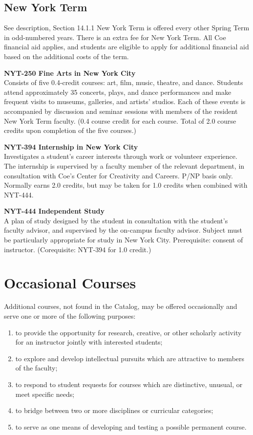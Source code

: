 \documentclass[
  letterpaper,
]{scrbook}
\providecommand{\tightlist}{%
  \setlength{\itemsep}{0pt}\setlength{\parskip}{0pt}}
\begin{document}
\subsection{New York Term}\label{sec-academic-programs-ny-term}

See description, Section 14.1.1 New York Term is offered every other
Spring Term in odd-numbered years. There is an extra fee for New York
Term. All Coe financial aid applies, and students are eligible to apply
for additional financial aid based on the additional costs of the term.

\textbf{NYT-250 Fine Arts in New York City}\\
Consists of five 0.4-credit courses: art, film, music, theatre, and
dance. Students attend approximately 35 concerts, plays, and dance
performances and make frequent visits to museums, galleries, and
artists' studios. Each of these events is accompanied by discussion and
seminar sessions with members of the resident New York Term faculty.
(0.4 course credit for each course. Total of 2.0 course credits upon
completion of the five courses.)

\textbf{NYT-394 Internship in New York City}\\
Investigates a student's career interests through work or volunteer
experience. The internship is supervised by a faculty member of the
relevant department, in consultation with Coe's Center for Creativity
and Careers. P/NP basis only. Normally earns 2.0 credits, but may be
taken for 1.0 credits when combined with NYT-444.

\textbf{NYT-444 Independent Study}\\
A plan of study designed by the student in consultation with the
student's faculty advisor, and supervised by the on-campus faculty
advisor. Subject must be particularly appropriate for study in New York
City. Prerequisite: consent of instructor. (Corequisite: NYT-394 for 1.0
credit.)

\section{Occasional
Courses}\label{sec-academic-programs-occasional-courses}

Additional courses, not found in the Catalog, may be offered
occasionally and serve one or more of the following purposes:

\begin{enumerate}
\def\labelenumi{\arabic{enumi}.}
\tightlist
\item
  to provide the opportunity for research, creative, or other scholarly
  activity for an instructor jointly with interested students;
\item
  to explore and develop intellectual pursuits which are attractive to
  members of the faculty;
\item
  to respond to student requests for courses which are distinctive,
  unusual, or meet specific needs;
\item
  to bridge between two or more disciplines or curricular categories;
\item
  to serve as one means of developing and testing a possible permanent
  course.
\end{enumerate}
\end{document}
